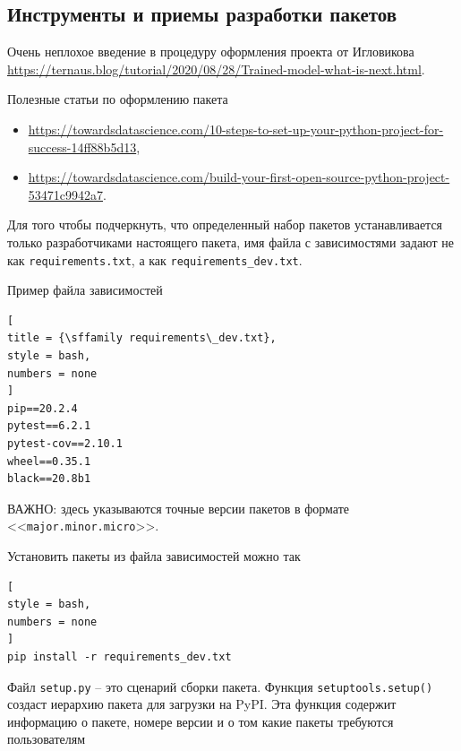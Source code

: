 \documentclass[%
	11pt,
	a4paper,
	utf8,
		]{article}
\begin{document}
\subsection{Инструменты и приемы разработки пакетов}

Очень неплохое введение в процедуру оформления проекта от Игловикова \url{https://ternaus.blog/tutorial/2020/08/28/Trained-model-what-is-next.html}.

Полезные статьи по оформлению пакета
\begin{itemize}
	\item \url{https://towardsdatascience.com/10-steps-to-set-up-your-python-project-for-success-14ff88b5d13},
	
	\item \url{https://towardsdatascience.com/build-your-first-open-source-python-project-53471c9942a7}.
\end{itemize}

Для того чтобы подчеркнуть, что определенный набор пакетов устанавливается только разработчиками настоящего пакета, имя файла с зависимостями задают не как \texttt{requirements.txt}, а как \texttt{requirements\_dev.txt}.

Пример файла зависимостей
\begin{lstlisting}[
title = {\sffamily requirements\_dev.txt},
style = bash,
numbers = none	
]
pip==20.2.4
pytest==6.2.1
pytest-cov==2.10.1
wheel==0.35.1
black==20.8b1
\end{lstlisting}

ВАЖНО: здесь указываются точные версии пакетов в формате <<\texttt{major.minor.micro}>>.

Установить пакеты из файла зависимостей можно так
\begin{lstlisting}[
style = bash,
numbers = none	
]
pip install -r requirements_dev.txt
\end{lstlisting}

Файл \texttt{setup.py} -- это сценарий сборки пакета. Функция \texttt{setuptools.setup()} создаст иерархию пакета для загрузки на PyPI. Эта функция содержит информацию о пакете, номере версии и о том какие пакеты требуются пользователям
\end{document}
